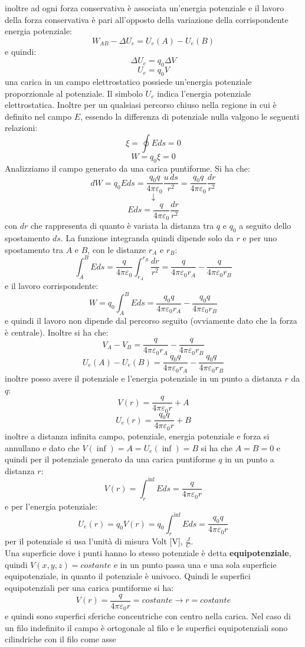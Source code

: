 \documentclass[a4paper,12pt, oneside]{book}
\begin{document}
inoltre ad ogni forza conservativa è associata un'energia potenziale e il lavoro della forza conservativa è pari all'opposto della variazione della corrispondente energia potenziale:
$$W_{AB}-\Delta U_e=U_e(A)-U_e(B)$$
e quindi:
$$\Delta U_e=q_0\Delta V$$
$$U_e=q_0V$$
una carica in un campo elettrostatico possiede un'energia potenziale proporzionale al potenziale. Il simbolo $U_e$ indica l'energia potenziale elettrostatica. Inoltre per un qualsiasi percorso chiuso nella regione in cui è definito nel campo $E$, essendo la differenza di potenziale nulla valgono le seguenti relazioni:
$$\xi=\oint Eds=0$$
$$W=q_0\xi=0$$
Analizziamo il campo generato da una carica puntiforme. Si ha che:
$$dW=q_0Eds=\frac{q_0q}{4\pi\varepsilon_0}\frac{u\,ds}{r^2}=\frac{q_0q}{4\pi\varepsilon_0}\frac{dr}{r^2}$$
$$\downarrow$$
$$Eds=\frac{q}{4\pi\varepsilon_0}\frac{dr}{r^2}$$
con $dr$ che rappresenta di quanto è variata la distanza tra $q$ e $q_0$ a seguito dello spostamento $ds$. La funzione integranda quindi dipende solo da $r$ e per uno spostamento tra $A$ e $B$, con le distanze $r_A$ e $r_B$:
$$\int_A^B Eds=\frac{q}{4\pi\varepsilon_0}\int_{r_A}^{r_B}\frac{dr}{r^2}=\frac{q}{4\pi\varepsilon_0r_A}-\frac{q}{4\pi\varepsilon_0r_B}$$
e il lavoro corrispondente:
$$W=q_0\int_A^B Eds=\frac{q_0q}{4\pi\varepsilon_0r_A}-\frac{q_0q}{4\pi\varepsilon_0r_B}$$
e quindi il lavoro non dipende dal percorso seguito (ovviamente dato che la forza è centrale). Inoltre si ha che:
$$V_A-V_B=\frac{q}{4\pi\varepsilon_0r_A}-\frac{q}{4\pi\varepsilon_0r_B}$$
$$U_e(A)-U_e(B)=\frac{q_0q}{4\pi\varepsilon_0r_A}-\frac{q_0q}{4\pi\varepsilon_0r_B}$$
inoltre posso avere il potenziale e l'energia potenziale in un punto a distanza $r$ da $q$:
$$V(r)=\frac{q}{4\pi\varepsilon_0r}+A$$
$$U_e(r)=\frac{q_0q}{4\pi\varepsilon_0r}+B$$
inoltre a distanza infinita campo, potenziale, energia potenziale e forza si annullano e dato che $V(\inf)=A=U_e(\inf)=B$ si ha che $A=B=0$ e quindi per il potenziale generato da una carica puntiforme $q$ in un punto a distanza $r$:
$$V(r)=\int_r^{\inf} Eds=\frac{q}{4\pi\varepsilon_0r}$$
e per l'energia potenziale:
$$U_e(r)=q_0V(r)=q_0\int_r^{\inf} Eds=\frac{q_0q}{4\pi\varepsilon_0r}$$
per il potenziale si usa l'unità di misura Volt [V], $\frac{J}{C}$.\\
Una superficie dove i punti hanno lo stesso potenziale è detta \textbf{equipotenziale}, quindi $V(x,y,z)=costante$ e in un punto passa una e una sola superficie equipotenziale, in quanto il potenziale è univoco. Quindi le superfici equipotenziali per una carica puntiforme si ha:
$$V(r)=\frac{q}{4\pi\varepsilon_0r}=costante\longrightarrow r=costante$$
e quindi sono superfici sferiche concentriche con centro nella carica. Nel caso di un filo indefinito il campo è ortogonale al filo e le superfici equipotenziali sono cilindriche con il filo come asse
\end{document}
